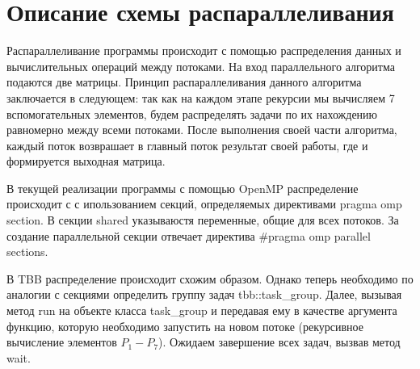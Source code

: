 \documentclass{report}
\begin{document}
\section*{Описание схемы распараллеливания}
\par Распараллеливание программы происходит с помощью распределения данных и вычислительных операций между потоками. На вход параллельного алгоритма подаются две матрицы. Принцип распараллеливания данного алгоритма заключается в следующем: так как на каждом этапе рекурсии мы вычисляем 7 вспомогательных элементов, будем распределять задачи по их нахождению равномерно между всеми потоками. После выполнения своей части алгоритма, каждый поток возврашает в главный поток результат своей работы, где и формируется выходная матрица.
\par В текущей реализации программы с помощью OpenMP распределение происходит с с ипользованием секций, определяемых директивами pragma omp section. В секции shared указываюстя переменные, общие для всех потоков. За создание параллельной секции отвечает директива \#pragma omp parallel sections.
\par В TBB распределение происходит схожим образом. Однако теперь необходимо по аналогии с секциями определить группу задач tbb::task\_group. Далее, вызывая метод run на объекте класса task\_group и передавая ему в качестве аргумента функцию, которую необходимо запустить на новом потоке (рекурсивное вычисление элементов $P_1 - P_7$). Ожидаем завершение всех задач, вызвав метод wait.
\newpage

\end{document}
